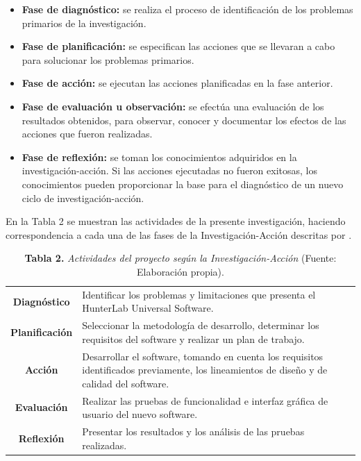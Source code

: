 	\begin{itemize}
		\item \textbf{Fase de diagn\'{o}stico:} se realiza el proceso de identificaci\'{o}n de los problemas primarios de la investigaci\'{o}n.
		\item \textbf{Fase de planificaci\'{o}n:} se especifican las acciones que se llevaran a cabo para solucionar los problemas primarios.
		\item \textbf{Fase de acci\'{o}n:} se ejecutan las acciones planificadas en la fase anterior.
		\item \textbf{Fase de evaluaci\'{o}n u observaci\'{o}n:} se efect\'{u}a una evaluaci\'{o}n de los resultados obtenidos, para observar, conocer y documentar los efectos de las acciones que fueron realizadas.
		\item \textbf{Fase de reflexi\'{o}n:} se toman los conocimientos adquiridos en la investigaci\'{o}n-acci\'{o}n. Si las acciones ejecutadas no fueron exitosas, los conocimientos pueden proporcionar la base para el diagn\'{o}stico de un nuevo ciclo de investigaci\'{o}n-acci\'{o}n.
	\end{itemize}

En la Tabla 2 se muestran las actividades de la presente investigaci\'{o}n, haciendo correspondencia a cada una de las fases de la Investigaci\'{o}n-Acci\'{o}n descritas por \cite{Baskerville}.

\FloatBarrier %
\vline
	\begin{table}[htb]
		\small
		\caption{\textbf{Tabla 2.} \textit{Actividades del proyecto seg\'{u}n la Investigaci\'{o}n-Acci\'{o}n} (Fuente: Elaboraci\'{o}n propia).}
		\centering
		\setlength{\extrarowheight}{5pt}
		\begin{tabulary}{15cm}{|c|L|}
			\hline
			 & \\ \hline
			\textbf{Diagn\'{o}stico} & Identificar los problemas y limitaciones que presenta el HunterLab Universal Software.\\ \hline
			\textbf{Planificaci\'{o}n} & Seleccionar la metodolog\'{i}a de desarrollo, determinar los requisitos del software y realizar un plan de trabajo.
\\ \hline
			\textbf{Acci\'{o}n} & Desarrollar el software, tomando en cuenta los requisitos identificados previamente, los lineamientos de dise\~{n}o y de calidad del software.\\ \hline
			\textbf{Evaluaci\'{o}n} & Realizar las pruebas de funcionalidad e interfaz gr\'{a}fica de usuario del nuevo software.\\ \hline
			\textbf{Reflexi\'{o}n} & Presentar los resultados y los an\'{a}lisis de las pruebas realizadas.\\ \hline
		\end{tabulary}
	\end{table}
\FloatBarrier %


